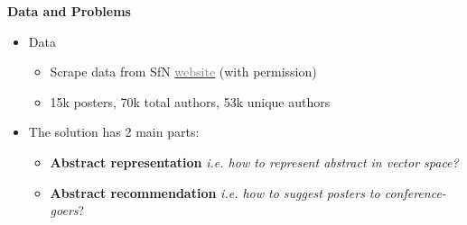 \begin{frame}{\textbf{Data and Problems}}

\begin{itemize}

\item Data
\begin{itemize}
\item Scrape data from SfN \href{http://www.abstractsonline.com/plan/BrowseResults.aspx?date=11/15/2014&mkey=\%7B54C85D94-6D69-4B09-AFAA-502C0E680CA7\%7D}{\textcolor{gray}{website}} (with permission)
\item 15k posters, 70k total authors, 53k unique authors
\end{itemize}


\item The solution has 2 main parts:
\begin{itemize}
\item \textbf{Abstract representation} \textit{i.e. how to represent abstract in vector space?}
\item \textbf{Abstract recommendation} \textit{i.e. how to suggest posters to conference-goers}?
\end{itemize}

\end{itemize}

\end{frame}